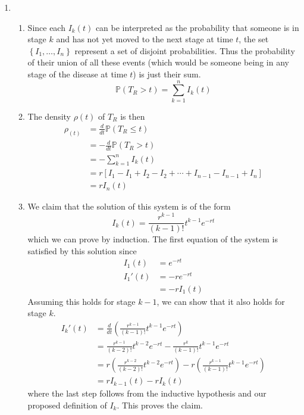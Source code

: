 \documentclass{article}
\begin{document}
\begin{enumerate}
        \item
	\begin{enumerate}
		\item Since each $I_k(t)$ can be interpreted as the probability that someone is in stage $k$ and has not yet moved to the next stage at time $t$, the set $\left\{ I_1, \dots, I_n \right\}$ represent a set of disjoint probabilities. Thus the probability of their union of all these events (which would be someone being in any stage of the disease at time $t $) is just their sum.
		\[
			\mathbb{P}(T_R > t) = \sum_{k=1}^{n} I_k(t) 
		\] 

		\item The density $\rho(t)$ of $T_R$ is then
		\begin{align*}
			\rho_(t) &= \frac{d }{d t} \mathbb{P}(T_R \leq t) \\
				 &= - \frac{d }{d t} \mathbb{P}(T_R > t) \\
				 &= - \sum_{k=1}^{n} I_k(t) \\
				 &= r \left[ I_1 - I_1 + I_2 - I_2 + \cdots + I_{n-1} - I_{n-1} + I_n \right] \\
				 &= r I_n(t)
		\end{align*}

		\item We claim that the solution of this system is of the form
		\[
			I_k(t) = \frac{r^{k-1}}{(k-1)!} t^{k-1} e^{-rt}
		\] 
		which we can prove by induction. The first equation of the system is satisfied by this solution since
		\begin{align*}
			I_1(t) &= e^{-rt} \\
			I_1'(t) &= -r e^{-rt} \\
				&= -r I_1(t)
		\end{align*}
		Assuming this holds for stage $k-1$, we can show that it also holds for stage $k$.
		\begin{align*}
			I_{k}'(t) &= \frac{d }{d t} \left( \frac{r^{k-1}}{(k-1)!} t^{k-1} e^{-rt}  \right) \\
				  &= \frac{r^{k-1}}{(k-2)!} t^{k-2} e^{-rt} - \frac{r^{k}}{(k-1)!} t^{k-1} e^{-rt} \\
				  &= r \left( \frac{r^{k-2}}{(k-2)!} t^{k-2} e^{-rt} \right) - r \left( \frac{r^{k-1}}{(k-1)!} t^{k-1} e^{-rt} \right) \\
				  &= r I_{k-1}(t) - r I_k(t)
		\end{align*}
		where the last step follows from the inductive hypothesis and our proposed definition of $I_k$. This proves the claim.


\end{enumerate}
\end{enumerate}
\end{document}
